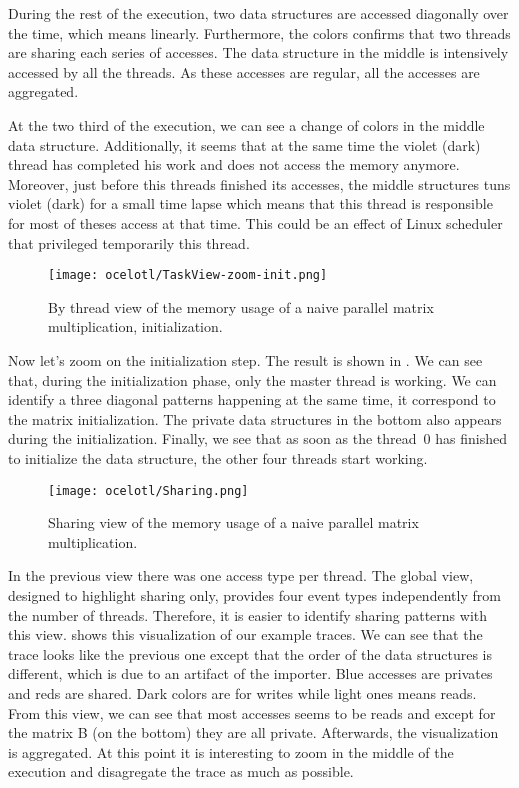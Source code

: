 During the rest of the execution, two data structures are accessed diagonally over the time, which means linearly.
Furthermore, the colors confirms that two threads are sharing each series of accesses.
The data structure in the middle is intensively accessed by all the threads.
As these accesses are regular, all the accesses are aggregated.

At the two third of the execution, we can see a change of colors in the middle data structure.
Additionally, it seems that at the same time the violet (dark) thread has completed his work and does not access the memory anymore.
Moreover, just before this threads finished its accesses, the middle structures tuns violet (dark) for a small time lapse which means that this thread is responsible for most of theses access at that time.
This could be an effect of Linux scheduler that privileged temporarily this thread.

\begin{figure}[htb]
    \centering
    \texttt{[image: ocelotl/TaskView-zoom-init.png]}
    \caption{By thread view of the memory usage of a naive parallel matrix multiplication,
    initialization.}
    \label{fig:ocelotl-th1}
\end{figure}

Now let's zoom on the initialization step.
The result is shown in .
We can see that, during the initialization phase, only the master thread is working.
We can identify a three diagonal patterns happening at the same time, it correspond to the matrix initialization.
The private data structures in the bottom also appears during the initialization.
Finally, we see that as soon as the thread~$0$ has finished to initialize the data structure, the other four threads start working.

\begin{figure}[htb]
    \centering
    \texttt{[image: ocelotl/Sharing.png]}
    \caption{Sharing view of the memory usage of a naive parallel matrix multiplication.}
    \label{fig:ocelotl-carto0}
\end{figure}

In the previous view there was one access type per thread.
The global view, designed to highlight sharing only, provides four event types independently from the number of threads.
Therefore, it is easier to identify sharing patterns with this view.
 shows this visualization of our example traces.
We can see that the trace looks like the previous one except that the order of the data structures is different, which is due to an artifact of the importer.
Blue accesses are privates and reds are shared.
Dark colors are for writes while light ones means reads.
From this view, we can see that most accesses seems to be reads and except for the matrix B (on the bottom) they are all private.
Afterwards, the visualization is aggregated.
At this point it is interesting to zoom in the middle of the execution and disagregate the trace as much as possible.

